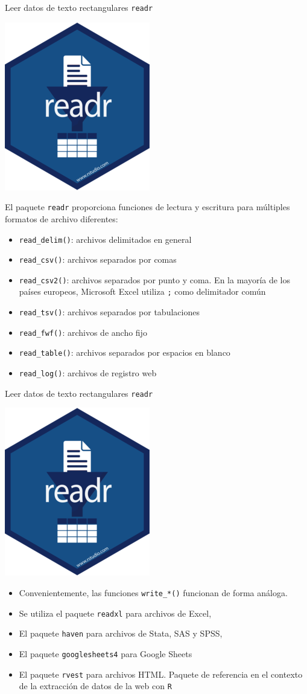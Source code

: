 \documentclass[
  ignorenonframetext,
  aspectratio=169]{beamer}
\providecommand{\tightlist}{%
  \setlength{\itemsep}{0pt}\setlength{\parskip}{0pt}}
\begin{document}
\begin{frame}[fragile]{Leer datos de texto rectangulares \texttt{readr}}
\label{leer-datos-de-texto-rectangulares-readr-1}
\begin{flushright}\includegraphics[width=0.05\linewidth]{Imgs/logo_readr} \end{flushright}

El paquete \texttt{readr} proporciona funciones de lectura y escritura
para múltiples formatos de archivo diferentes:

\begin{itemize}
\tightlist
\item
  \texttt{read\_delim()}: archivos delimitados en general
\item
  \texttt{read\_csv()}: archivos separados por comas
\item
  \texttt{read\_csv2()}: archivos separados por punto y coma. En la
  mayoría de los países europeos, Microsoft Excel utiliza \texttt{;}
  como delimitador común
\item
  \texttt{read\_tsv()}: archivos separados por tabulaciones
\item
  \texttt{read\_fwf()}: archivos de ancho fijo
\item
  \texttt{read\_table()}: archivos separados por espacios en blanco
\item
  \texttt{read\_log()}: archivos de registro web
\end{itemize}
\end{frame}

\begin{frame}[fragile]{Leer datos de texto rectangulares \texttt{readr}}
\label{leer-datos-de-texto-rectangulares-readr-2}
\begin{flushright}\includegraphics[width=0.05\linewidth]{Imgs/logo_readr} \end{flushright}

\begin{itemize}
\item
  Convenientemente, las funciones \texttt{write\_*()} funcionan de forma
  análoga.
\item
  Se utiliza el paquete \texttt{readxl} para archivos de Excel,
\item
  El paquete \texttt{haven} para archivos de Stata, SAS y SPSS,
\item
  El paquete \texttt{googlesheets4} para Google Sheets
\item
  El paquete \texttt{rvest} para archivos HTML. Paquete de referencia en
  el contexto de la extracción de datos de la web con \texttt{R}
\end{itemize}
\end{frame}
\end{document}

